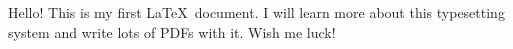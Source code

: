 \documentclass{article}
\begin{document}
	Hello! This is my first \LaTeX\ document. I will learn more about this typesetting system and write lots of PDFs with it. Wish me luck!
	
\end{document}
